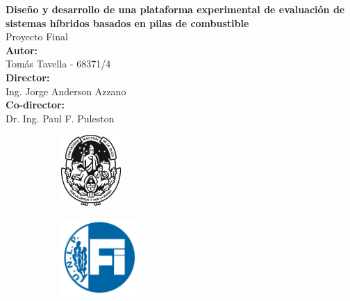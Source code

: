     \begin{titlepage}
        \begin{center}
            \vspace*{0.5cm}
            \Huge
            \textbf{Diseño y desarrollo de una plataforma experimental de evaluación de sistemas híbridos basados en pilas de combustible}    %
            \\
            \vspace{0.5cm}
            \huge
            Proyecto Final                                       %
            \\
            \vspace{2cm}
            \Large
            \textbf{Autor:}
            \\
            \large
            \vspace{0.2cm}
            Tomás Tavella - 68371/4
            \\
            \vspace{1cm}
            \Large
            \textbf{Director:}
            \\
            \vspace{0.2cm}
            \large
            Ing. Jorge Anderson Azzano
            \\
            \vspace{0.3cm}
            \Large
            \textbf{Co-director:}
            \\
            \vspace{0.2cm}
            \large
            Dr. Ing. Paul F. Puleston
            \\
            \vfill
            \begin{figure}[H]
                \centering
                \begin{subfigure}
                    \centering
                    \includegraphics[width=0.25\textwidth]{Imagenes/UNLP.pdf}
                \end{subfigure}
                \begin{subfigure}
                    \centering
                    \includegraphics[width=0.32\textwidth]{Imagenes/FI.jpg}

\end{subfigure}
\end{figure}
\end{center}
\end{titlepage}
